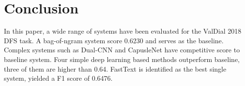 \documentclass[11pt]{article}
\begin{document}
\section{Conclusion}
In this paper, a wide range of systems have been evaluated for the ValDial 2018 DFS task. A bag-of-ngram system score 0.6230 and serves as the baseline. Complex systems such as Dual-CNN and CapusleNet have competitive score to baseline system. Four simple deep learning based methods outperform baseline, three of them are higher than 0.64. FastText is identified as the best single system, yielded a F1 score of 0.6476.




%






\end{document}
